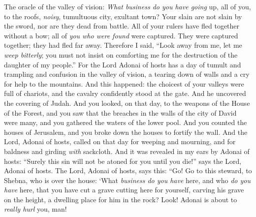 \begin{biblechapter} %
 The oracle of the valley of vision: \textit{What business do you have going} up, all of you, to the roofs,
\verse \textit{noisy}, tumultuous city, 
exultant town? 
Your slain are not slain by the sword, 
nor are they dead from battle.
\verse All of your rulers have fled together without a bow; 
all of \textit{you who were found} were captured. 
They were captured together; 
they had fled far away.
\verse Therefore I said,
\verse “Look away from me, 
let me \textit{weep bitterly}; 
you must not insist on comforting me 
for the destruction of the daughter of my people.”
\verse For the Lord Adonai of hosts has a day of tumult and trampling and confusion in the valley of vision, 
a tearing down of walls and a cry for help to the mountains.
\verse And this happened:
\verse the choicest of your valleys were full of chariots, 
and the cavalry confidently stood at the gate.
\verse And he uncovered the covering of Judah. 
And you looked, on that day, to the weapons of the House of the Forest,
\verse and you saw that the breaches in the walls of the city of David were many, 
and you gathered the waters of the lower pool.
\verse And you counted the houses of Jerusalem, 
and you broke down the houses to fortify the wall.
\verse And the Lord, Adonai of hosts, called on that day
\verse for weeping and mourning, 
and for baldness and girding \textit{with} sackcloth.
\verse And it was revealed in my ears by Adonai of hosts: “Surely this sin will not be atoned for you until you die!” 
says the Lord, Adonai of hosts.
 The Lord, Adonai of hosts, says this:
\verse “Go! Go to this steward, to Shebna, 
who is over the house:
\verse ‘What \textit{business do you have} here, 
and who \textit{do you have} here, 
that you have cut a grave cutting here for yourself, 
carving his grave on the height, 
a dwelling place for him in the rock?
\verse Look! Adonai is about to \textit{really hurl} you, man! 

\end{biblechapter}
